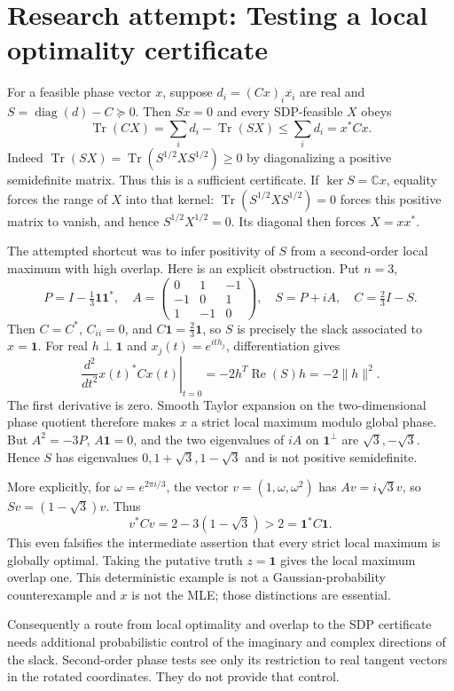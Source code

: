 \documentclass[11pt]{article}
\begin{document}
\section{Research attempt: Testing a local optimality certificate}
For a feasible phase vector $x$, suppose $d_i=(Cx)_i\overline{x_i}$ are real and
$S=\operatorname{diag}(d)-C\succeq0$. Then $Sx=0$ and every SDP-feasible $X$ obeys
\[
 \operatorname{Tr}(CX)=\sum_i d_i-\operatorname{Tr}(SX)\le\sum_i d_i=x^*Cx.
\]
Indeed $\operatorname{Tr}(SX)=\operatorname{Tr}(S^{1/2}XS^{1/2})\ge0$ by
diagonalizing a positive semidefinite matrix. Thus this is a sufficient certificate.
If $\ker S=\mathbb Cx$, equality forces the range of $X$ into that kernel:
$\operatorname{Tr}(S^{1/2}XS^{1/2})=0$ forces this positive matrix to vanish,
and hence $S^{1/2}X^{1/2}=0$. Its diagonal then forces $X=xx^*$.

The attempted shortcut was to infer positivity of $S$ from a second-order local
maximum with high overlap. Here is an explicit obstruction. Put $n=3$,
\[
 P=I-\tfrac13\mathbf1\mathbf1^*,\quad
 A=\begin{pmatrix}0&1&-1\\-1&0&1\\1&-1&0\end{pmatrix},\quad
 S=P+iA,\quad C=\tfrac23 I-S.
\]
Then $C=C^*$, $C_{ii}=0$, and $C\mathbf1=\tfrac23\mathbf1$, so $S$ is precisely
the slack associated to $x=\mathbf1$. For real $h\perp\mathbf1$ and
$x_j(t)=e^{ith_j}$, differentiation gives
\[
 \left.\frac{d^2}{dt^2}x(t)^*Cx(t)\right|_{t=0}
 =-2h^T\operatorname{Re}(S)h=-2\|h\|^2.
\]
The first derivative is zero. Smooth Taylor expansion on the two-dimensional
phase quotient therefore makes $x$ a strict local maximum modulo global phase.
But $A^2=-3P$, $A\mathbf1=0$, and the two eigenvalues of $iA$ on
$\mathbf1^\perp$ are $\sqrt3,-\sqrt3$. Hence $S$ has eigenvalues
$0,1+\sqrt3,1-\sqrt3$ and is not positive semidefinite.

More explicitly, for $\omega=e^{2\pi i/3}$, the vector
$v=(1,\omega,\omega^2)$ has $Av=i\sqrt3v$, so
$Sv=(1-\sqrt3)v$. Thus
\[
 v^*Cv=2-3(1-\sqrt3)>2=\mathbf1^*C\mathbf1.
\]
This even falsifies the intermediate assertion that every strict local maximum
is globally optimal. Taking the putative truth $z=\mathbf1$ gives the local
maximum overlap one. This deterministic example is not a Gaussian-probability
counterexample and $x$ is not the MLE; those distinctions are essential.

Consequently a route from local optimality and overlap to the SDP certificate
needs additional probabilistic control of the imaginary and complex directions
of the slack. Second-order phase tests see only its restriction to real tangent
vectors in the rotated coordinates. They do not provide that control.
\end{document}
